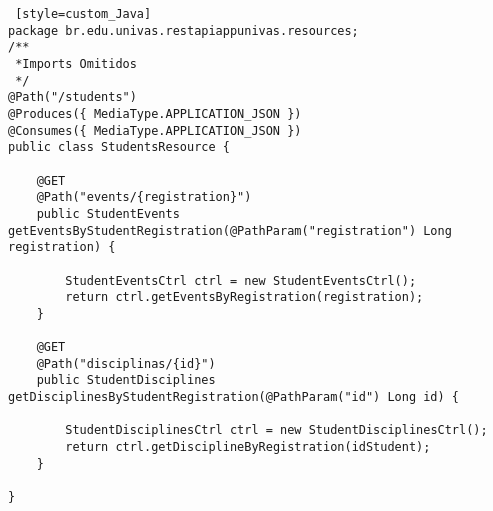 \begin{lstlisting} [style=custom_Java]
package br.edu.univas.restapiappunivas.resources;
/**
 *Imports Omitidos
 */
@Path("/students")
@Produces({ MediaType.APPLICATION_JSON })
@Consumes({ MediaType.APPLICATION_JSON })
public class StudentsResource {

	@GET
	@Path("events/{registration}")
	public StudentEvents getEventsByStudentRegistration(@PathParam("registration") Long registration) {

		StudentEventsCtrl ctrl = new StudentEventsCtrl();
		return ctrl.getEventsByRegistration(registration);
	}

	@GET
	@Path("disciplinas/{id}")
	public StudentDisciplines getDisciplinesByStudentRegistration(@PathParam("id") Long id) {
	
		StudentDisciplinesCtrl ctrl = new StudentDisciplinesCtrl();
		return ctrl.getDisciplineByRegistration(idStudent);
	}

}


\end{lstlisting}
